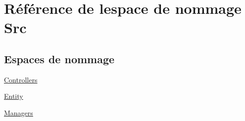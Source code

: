 \hypertarget{namespace_src}{}\section{Référence de l\textquotesingle{}espace de nommage Src}
\label{namespace_src}
\subsection*{Espaces de nommage}
\begin{DoxyCompactItemize}
\item 
 \hyperlink{namespace_src_1_1_controllers}{Controllers}
\item 
 \hyperlink{namespace_src_1_1_entity}{Entity}
\item 
 \hyperlink{namespace_src_1_1_managers}{Managers}
\end{DoxyCompactItemize}
